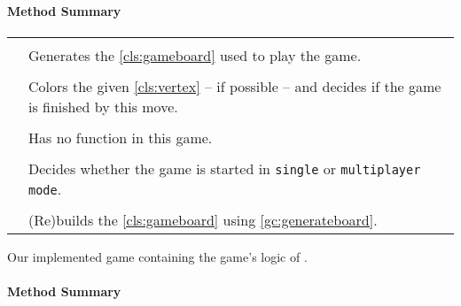 \paragraph*{Method Summary}
\paragraph*{}
\begin{longtable}{Lp{10cm}}
	\startmethodtable
	 \\
	& Generates the \ref{cls:gameboard} used to play the game. \\
	 \\
	& Colors the given \ref{cls:vertex} -- if possible -- and decides if the game is finished by this move. \\
	 \\
	& Has no function in this game. \\
	 \\
	& Decides whether the game is started in \texttt{single} or \texttt{multiplayer mode}. \\
	 \\
	& (Re)builds the \ref{cls:gameboard} using \ref{gc:generateboard}. \\
	\hline
\end{longtable}

\pagebreak

Our implemented game containing the game's logic of \twixt. \\

\centerdash

\paragraph*{Method Summary}
